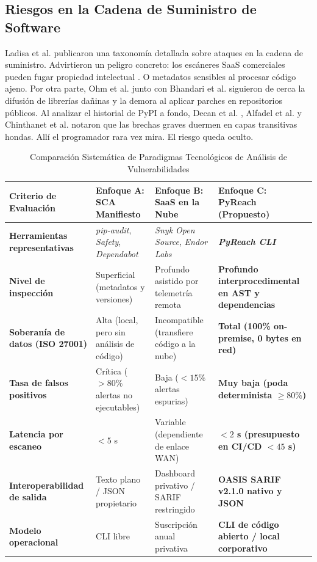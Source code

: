 \documentclass[conference]{IEEEtran}
\begin{document}
\subsection{Riesgos en la Cadena de Suministro de Software}
Ladisa et al. \cite{ladisa2023sok} publicaron una taxonomía detallada sobre ataques en la cadena de suministro. Advirtieron un peligro concreto: los escáneres SaaS comerciales pueden fugar propiedad intelectual \cite{ladisa2023sok}. O metadatos sensibles al procesar código ajeno. Por otra parte, Ohm et al. \cite{ohm2022sok} junto con Bhandari et al. \cite{bhandari2022cvefixes} siguieron de cerca la difusión de librerías dañinas y la demora al aplicar parches en repositorios públicos. Al analizar el historial de PyPI a fondo, Decan et al. \cite{decan2019empirical}, Alfadel et al. \cite{alfadel2023empirical} y Chinthanet et al. \cite{chinthanet2023lag} notaron que las brechas graves duermen en capas transitivas hondas. Allí el programador rara vez mira. El riesgo queda oculto.

\begin{table}[!t]
\centering
\caption{Comparación Sistemática de Paradigmas Tecnológicos de Análisis de Vulnerabilidades}
\label{tab:estado_arte}
\small
\begin{tabular}{>{\raggedright\arraybackslash}p{3.6cm}>{\raggedright\arraybackslash}p{4.3cm}>{\raggedright\arraybackslash}p{4.3cm}>{\raggedright\arraybackslash}p{4.3cm}}
\toprule
\textbf{Criterio de Evaluación} & \textbf{Enfoque A: SCA Manifiesto} & \textbf{Enfoque B: SaaS en la Nube} & \textbf{Enfoque C: PyReach (Propuesto)} \\
\midrule
\textbf{Herramientas representativas} & \textit{pip-audit}, \textit{Safety}, \textit{Dependabot} & \textit{Snyk Open Source}, \textit{Endor Labs} & \textbf{\textit{PyReach CLI}} \\
\textbf{Nivel de inspección} & Superficial (metadatos y versiones) & Profundo asistido por telemetría remota & \textbf{Profundo interprocedimental en AST y dependencias} \\
\textbf{Soberanía de datos (ISO 27001)} & Alta (local, pero sin análisis de código) & Incompatible (transfiere código a la nube) & \textbf{Total (100\% on-premise, 0 bytes en red)} \\
\textbf{Tasa de falsos positivos} & Crítica ($>80\%$ alertas no ejecutables) & Baja ($<15\%$ alertas espurias) & \textbf{Muy baja (poda determinista $\ge 80\%$)} \\
\textbf{Latencia por escaneo} & $<5$ s & Variable (dependiente de enlace WAN) & \textbf{$<2$ s (presupuesto en CI/CD $<45$ s)} \\
\textbf{Interoperabilidad de salida} & Texto plano / JSON propietario & Dashboard privativo / SARIF restringido & \textbf{OASIS SARIF v2.1.0 nativo y JSON} \\
\textbf{Modelo operacional} & CLI libre & Suscripción anual privativa & \textbf{CLI de código abierto / local corporativo} \\
\bottomrule
\end{tabular}
\end{table}
\end{document}
